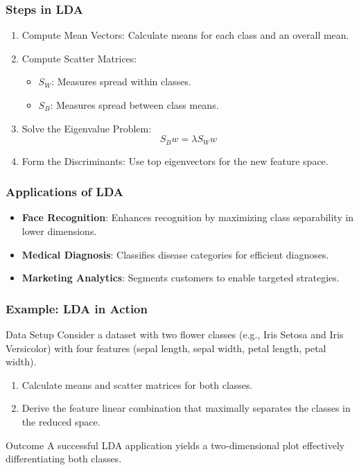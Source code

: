 \documentclass[aspectratio=169]{beamer}
\begin{document}
\begin{frame}[fragile]
    \frametitle{Steps in LDA}
    \begin{enumerate}
        \item Compute Mean Vectors: Calculate means for each class and an overall mean.
        \item Compute Scatter Matrices:
        \begin{itemize}
            \item $S_W$: Measures spread within classes.
            \item $S_B$: Measures spread between class means.
        \end{itemize}
        \item Solve the Eigenvalue Problem:
        \begin{equation}
            S_B w = \lambda S_W w
        \end{equation}
        \item Form the Discriminants: Use top eigenvectors for the new feature space.
    \end{enumerate}
\end{frame}

\begin{frame}[fragile]
    \frametitle{Applications of LDA}
    \begin{itemize}
        \item \textbf{Face Recognition}: Enhances recognition by maximizing class separability in lower dimensions.
        \item \textbf{Medical Diagnosis}: Classifies disease categories for efficient diagnoses.
        \item \textbf{Marketing Analytics}: Segments customers to enable targeted strategies.
    \end{itemize}
\end{frame}

\begin{frame}[fragile]
    \frametitle{Example: LDA in Action}
    \begin{block}{Data Setup}
        Consider a dataset with two flower classes (e.g., Iris Setosa and Iris Versicolor) with four features (sepal length, sepal width, petal length, petal width).
    \end{block}
    \begin{enumerate}
        \item Calculate means and scatter matrices for both classes.
        \item Derive the feature linear combination that maximally separates the classes in the reduced space.
    \end{enumerate}
    \begin{block}{Outcome}
        A successful LDA application yields a two-dimensional plot effectively differentiating both classes.
    \end{block}
\end{frame}
\end{document}
